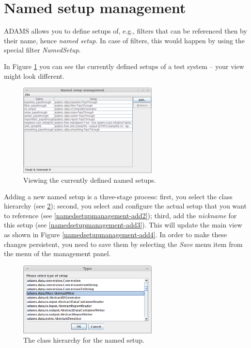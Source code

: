 \clearpage
\newpage
\section{Named setup management}
ADAMS allows you to define setups of, e.g., filters that can be referenced 
then by their name, hence \textit{named setup}. In case of filters, this would 
happen by using the special filter \textit{NamedSetup}. 

In Figure \ref{namedsetupmanagement-main} you can see the currently defined
setups of a test system -- your view might look different.

\begin{figure}[htb]
  \centering
  \includegraphics[width=7.0cm]{images/namedsetupmanagement-main.png}
  \caption{Viewing the currently defined named setups.}
  \label{namedsetupmanagement-main}
\end{figure}

Adding a new named setup is a three-stage process: first, you select the
class hierarchy (see \ref{namedsetupmanagement-add1}); second, you select and
configure the actual setup that you want to reference (see 
\ref{namedsetupmanagement-add2}); third, add the \textit{nickname} for 
this setup (see \ref{namedsetupmanagement-add3}). This will update the main
view as shown in Figure \ref{namedsetupmanagement-add4}. In order to make these
changes persistent, you need to save them by selecting the \textit{Save} menu 
item from the menu of the management panel.

\begin{figure}[htb]
  \centering
  \includegraphics[width=7.0cm]{images/namedsetupmanagement-add1.png}
  \caption{The class hierarchy for the named setup.}
  \label{namedsetupmanagement-add1}
\end{figure}


